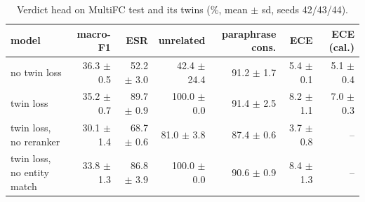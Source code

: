 \begin{table}[t]
\centering
\caption{Verdict head on MultiFC test and its twins (\%, mean $\pm$ sd, seeds 42/43/44).}
\label{tab:tab_main}
\begin{tabular}{lrrrrrr}
\toprule
model & macro-F1 & ESR & unrelated & paraphrase cons. & ECE & ECE (cal.) \\
\midrule
no twin loss & 36.3 $\pm$ 0.5 & 52.2 $\pm$ 3.0 & 42.4 $\pm$ 24.4 & 91.2 $\pm$ 1.7 & 5.4 $\pm$ 0.1 & 5.1 $\pm$ 0.4 \\
twin loss & 35.2 $\pm$ 0.7 & 89.7 $\pm$ 0.9 & 100.0 $\pm$ 0.0 & 91.4 $\pm$ 2.5 & 8.2 $\pm$ 1.1 & 7.0 $\pm$ 0.3 \\
twin loss, no reranker & 30.1 $\pm$ 1.4 & 68.7 $\pm$ 0.6 & 81.0 $\pm$ 3.8 & 87.4 $\pm$ 0.6 & 3.7 $\pm$ 0.8 & – \\
twin loss, no entity match & 33.8 $\pm$ 1.3 & 86.8 $\pm$ 3.9 & 100.0 $\pm$ 0.0 & 90.6 $\pm$ 0.9 & 8.4 $\pm$ 1.3 & – \\
\bottomrule
\end{tabular}
\end{table}
